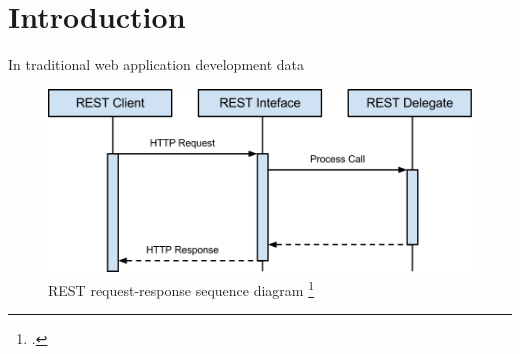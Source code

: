 

\title{\papertitle}
\author{Rocco Schulz, Max V\"{o}kler, Joe Boden,\\ Robert Wawrzyniak, Can Paul Bineytioglu\\\\
	Corporate State University\\Baden-Wuerttemberg - Stuttgart}

\date{\today}



\maketitle

\begin{abstract}
This paper evaluates asynchronous server technologies. Strenghts and weaknesses
of asynchronous programming models are elaborated and a proof of concept 
based on node.js and vert.x is used to evaluate non-functional attributes such as
maintainability. \ldots
\end{abstract}
\newpage

\tableofcontents
\newpage

\listoffigures
{}
\newpage

\printnomenclature
{}
\newpage

\section{Introduction}

In traditional web application development data 

\begin{figure}[hbtp]
\centering
\includegraphics[scale=0.75]{img/image01.png}
\caption{REST request-response sequence diagram \footcite{req_res}\label{img_req_res}}
\end{figure}

